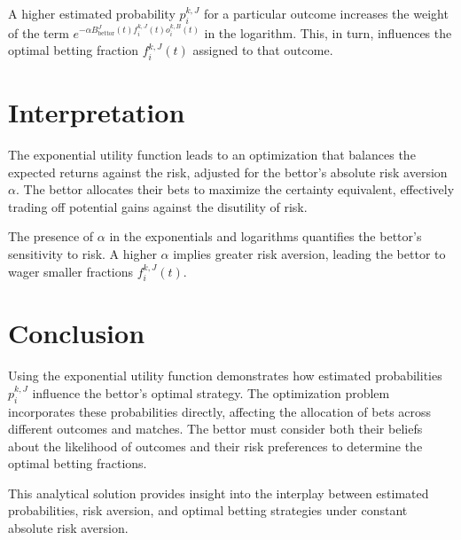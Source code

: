 A higher estimated probability \( p_i^{k,J} \) for a particular outcome increases the weight of the term \( e^{ -\alpha B_{\text{bettor}}^J(t) f_i^{k,J}(t) o_i^{k,B}(t) } \) in the logarithm. This, in turn, influences the optimal betting fraction \( f_i^{k,J}(t) \) assigned to that outcome.

\section{Interpretation}

The exponential utility function leads to an optimization that balances the expected returns against the risk, adjusted for the bettor's absolute risk aversion \( \alpha \). The bettor allocates their bets to maximize the certainty equivalent, effectively trading off potential gains against the disutility of risk.

The presence of \( \alpha \) in the exponentials and logarithms quantifies the bettor's sensitivity to risk. A higher \( \alpha \) implies greater risk aversion, leading the bettor to wager smaller fractions \( f_i^{k,J}(t) \).

\section{Conclusion}

Using the exponential utility function demonstrates how estimated probabilities \( p_i^{k,J} \) influence the bettor's optimal strategy. The optimization problem incorporates these probabilities directly, affecting the allocation of bets across different outcomes and matches. The bettor must consider both their beliefs about the likelihood of outcomes and their risk preferences to determine the optimal betting fractions.

This analytical solution provides insight into the interplay between estimated probabilities, risk aversion, and optimal betting strategies under constant absolute risk aversion.